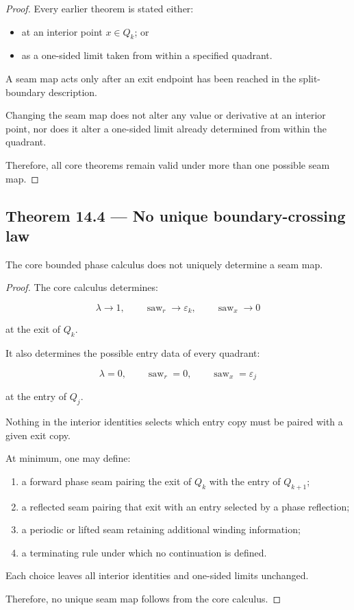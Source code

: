 \documentclass[11pt,oneside,openany]{book}
\newcommand{\PCsubsection}[1]{%
  \subsection*{#1}%
}
\begin{document}
\begin{proof}
Every earlier theorem is stated either:

\begin{itemize}
\item at an interior point \(x\in Q_k\); or
\item as a one-sided limit taken from within a specified quadrant.
\end{itemize}
A seam map acts only after an exit endpoint has been reached in the split-boundary description.

Changing the seam map does not alter any value or derivative at an interior point, nor does it alter a one-sided limit already determined from within the quadrant.

Therefore, all core theorems remain valid under more than one possible seam map.

\end{proof}

\PCsubsection{Theorem 14.4 --- No unique boundary-crossing law}

The core bounded phase calculus does not uniquely determine a seam map.

\begin{proof}
The core calculus determines:

\[
\lambda\to1, \qquad \operatorname{saw}_{r}\to\varepsilon_k, \qquad \operatorname{saw}_{x}\to0
\]


at the exit of \(Q_k\).

It also determines the possible entry data of every quadrant:

\[
\lambda=0, \qquad \operatorname{saw}_{r}=0, \qquad \operatorname{saw}_{x}=\varepsilon_j
\]


at the entry of \(Q_j\).

Nothing in the interior identities selects which entry copy must be paired with a given exit copy.

At minimum, one may define:

\begin{enumerate}
\item a forward phase seam pairing the exit of \(Q_k\) with the entry of \(Q_{k+1}\);
\item a reflected seam pairing that exit with an entry selected by a phase reflection;
\item a periodic or lifted seam retaining additional winding information;
\item a terminating rule under which no continuation is defined.
\end{enumerate}
Each choice leaves all interior identities and one-sided limits unchanged.

Therefore, no unique seam map follows from the core calculus.

\end{proof}
\end{document}
